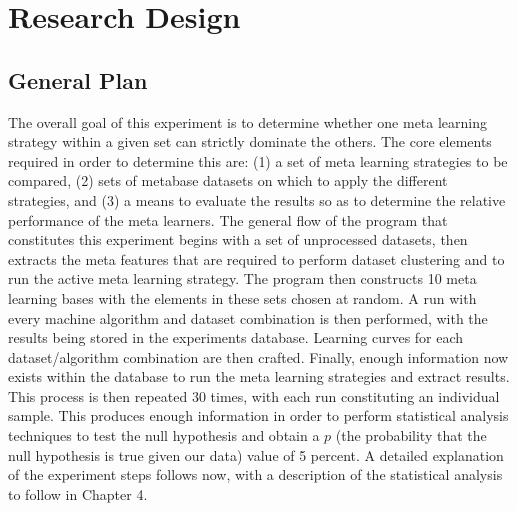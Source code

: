 \chapter{Research Design}
\label{Chapter3}
\section{General Plan}
The overall goal of this experiment is to determine whether one meta learning
strategy within a given set can strictly dominate the others. The core elements
required in order to determine this are: (1) a set of meta learning strategies to be
compared, (2) sets of metabase datasets on which to apply the different strategies,
and (3) a means to evaluate the results so as to determine the relative performance
of the meta learners. The general flow of the program that constitutes this
experiment begins with a set of unprocessed datasets, then extracts the
meta features that are required to perform dataset clustering and to
run the active meta learning strategy. The program then constructs 10
meta learning bases with the elements in these sets chosen at random. A run with
every machine algorithm and dataset combination is then performed, with the
results being stored in the experiments database. Learning curves for each
dataset/algorithm combination are then crafted. Finally, enough information now
exists within the database to run the meta learning strategies
and extract results. This process is then repeated 30 times, with each run
constituting an individual sample. This produces enough information in order
to perform statistical analysis techniques to test the null hypothesis and
obtain a $p$ (the probability that the null hypothesis is true given our data)
value of 5 percent. A detailed explanation of the experiment steps follows now,
with a description of the statistical analysis to follow in Chapter 4.

